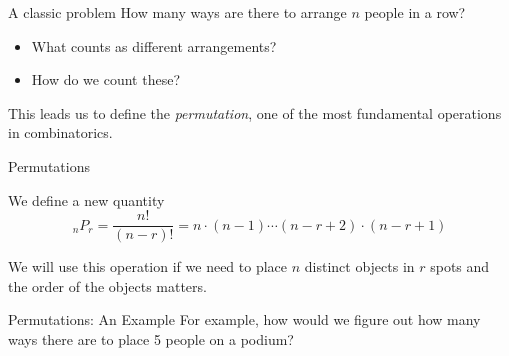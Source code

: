 \documentclass[aspectratio=169,xcolor=dvipsnames]{beamer}
\begin{document}
\begin{frame}[t]{A classic problem}
    How many ways are there to arrange $n$ people in a row?

    \begin{itemize}
        \item What counts as different arrangements? 
        \item How do we count these?
    \end{itemize}
    
    \vspace{4cm}
    
    This leads us to define the \textit{permutation}, one of the most fundamental operations in combinatorics.
\end{frame}

\begin{frame}[t]{Permutations}
    \begin{definition}
    We define a new quantity
    \[
        _nP_r=\frac{n!}{(n-r)!}=n\cdot(n-1)\cdots(n-r+2)\cdot(n-r+1)
    \]
    \end{definition}
    
    \vspace{1em}
    
    We will use this operation if we need to place $n$ distinct objects in $r$ spots and the order of the objects matters.
\end{frame}

\begin{frame}[t]{Permutations: An Example}
    For example, how would we figure out how many ways there are to place 5 people on a podium?
    
\end{frame}
\end{document}
